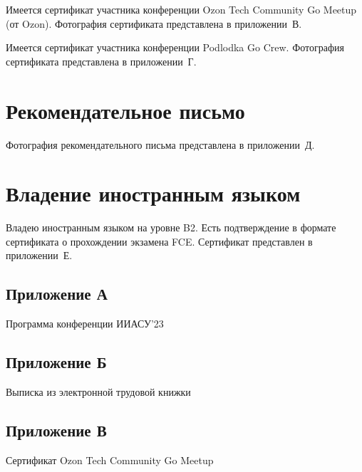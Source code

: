 \documentclass[14pt]{extarticle}
\begin{document}
Имеется сертификат участника конференции Ozon Tech Community Go Meetup (от Ozon). Фотография сертификата представлена в приложении~В.

Имеется сертификат участника конференции Podlodka Go Crew. Фотография сертификата представлена в приложении~Г.

\section{Рекомендательное письмо}

Фотография рекомендательного письма представлена в приложении~Д.

\section{Владение иностранным языком}

Владею иностранным языком на уровне B2. Есть подтверждение в формате сертификата о прохождении экзамена FCE. Сертификат представлен в приложении~Е.

\newpage

\begin{center}
\section*{Приложение А}

Программа конференции ИИАСУ'23
\end{center}



\newpage

\begin{center}
\section*{Приложение Б}

Выписка из электронной трудовой книжки
\end{center}



\newpage

\begin{center}
\section*{Приложение В}

Сертификат Ozon Tech Community Go Meetup
\end{center}
\end{document}

